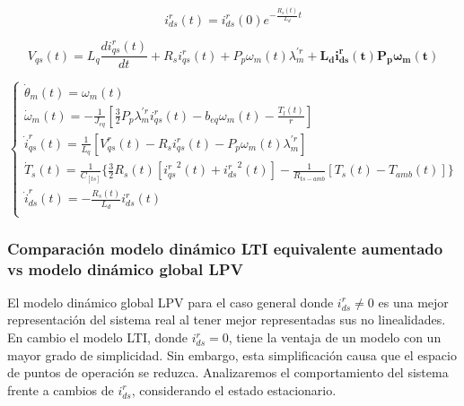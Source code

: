 \documentclass{article}
\begin{document}
\begin{enumerate}[label=\roman*.]
    \begin{equation}
        i_{ds}^r(t) = i_{ds}^r(0)e^{-\frac{R_{s}(t)}{L_{d}}t}
    \end{equation}

    \begin{equation}
        V_{qs}(t) = L_{q}\frac{di_{qs}^r(t)}{dt} + R_{s}i_{qs}^r(t) + P_{p}\omega_{m}(t)\lambda_{m}^{\prime r} + \mathbf{L_{d}i_{ds}^r(t)P_{p}\omega_{m}(t)}
    \end{equation}

    \begin{equation}
        \begin{cases}
            \dot{\theta}_{m}(t) = \omega_{m}(t)\\
            \dot{\omega}_{m}(t) = -\frac{1}{J_{eq}}[\frac{3}{2}P_{p}\lambda_{m}^{\prime r} i_{qs}^r(t) - b_{eq}\omega_{m}(t)-\frac{T_{l}(t)}{r}]\\
            \dot{i}_{qs}^r(t) = \frac{1}{L_{q}}[V_{qs}^r(t) - R_{s}i_{qs}^r(t) - P_{p}\omega_{m}(t)\lambda_{m}^{\prime r}]\\
            \dot{T}_{s}(t) = \frac{1}{C_[ts]}\{\frac{3}{2}R_{s}(t)[{i_{qs}^r}^2(t) + {i_{ds}^r}^2(t)] - \frac{1}{R_{ts-amb}}[T_{s}(t) - T_{amb}(t)]\}\\
            \dot{i}_{ds}^r(t) = -\frac{R_{s}(t)}{L_{d}}i_{ds}^r(t) \\
        \end{cases}    
    \end{equation}

\end{enumerate}


\subsubsection*{Comparación modelo dinámico LTI equivalente aumentado vs modelo dinámico global LPV}

El modelo dinámico global LPV para el caso general donde $i_{ds}^r \neq 0$
es una mejor representación del sistema real al tener mejor representadas sus 
no linealidades.
En cambio el modelo LTI, donde $i_{ds}^r = 0$, tiene la ventaja de un modelo 
con un mayor grado de simplicidad. Sin embargo, esta simplificación  causa que 
el espacio de puntos de operación se reduzca.
Analizaremos el comportamiento del sistema frente a cambios de $i_{ds}^r$, 
considerando el estado estacionario. 
\end{document}
